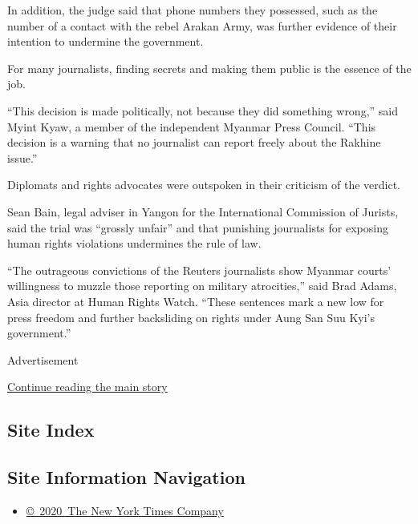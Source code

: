 In addition, the judge said that phone numbers they possessed, such as
the number of a contact with the rebel Arakan Army, was further evidence
of their intention to undermine the government.

For many journalists, finding secrets and making them public is the
essence of the job.

``This decision is made politically, not because they did something
wrong,'' said Myint Kyaw, a member of the independent Myanmar Press
Council. ``This decision is a warning that no journalist can report
freely about the Rakhine issue.''

Diplomats and rights advocates were outspoken in their criticism of the
verdict.

Sean Bain, legal adviser in Yangon for the International Commission of
Jurists, said the trial was ``grossly unfair'' and that punishing
journalists for exposing human rights violations undermines the rule of
law.

``The outrageous convictions of the Reuters journalists show Myanmar
courts' willingness to muzzle those reporting on military atrocities,''
said Brad Adams, Asia director at Human Rights Watch. ``These sentences
mark a new low for press freedom and further backsliding on rights under
Aung San Suu Kyi's government.''

Advertisement

\protect\hyperlink{after-bottom}{Continue reading the main story}

\hypertarget{site-index}{%
\subsection{Site Index}\label{site-index}}

\hypertarget{site-information-navigation}{%
\subsection{Site Information
Navigation}\label{site-information-navigation}}

\begin{itemize}
\tightlist
\item
  \href{https://help.nytimes3xbfgragh.onion/hc/en-us/articles/115014792127-Copyright-notice}{©~2020~The
  New York Times Company}
\end{itemize}

